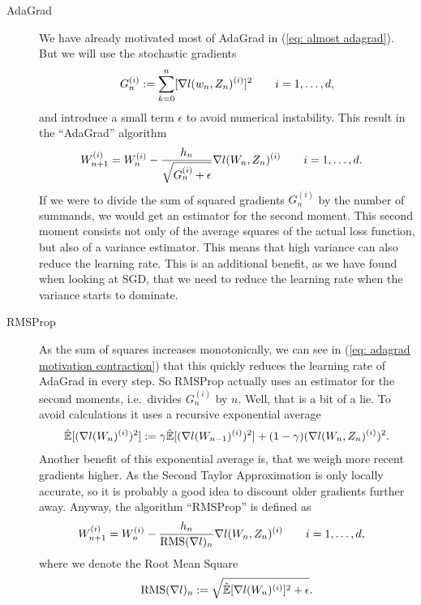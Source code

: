 \begin{description}
	\item[AdaGrad] \parencite{duchiAdaptiveSubgradientMethods2011}
	We have already motivated most of AdaGrad in (\ref{eq: almost adagrad}).
	But we will use the stochastic gradients
	\begin{align*}
		G_n^{(i)} := \sum_{k=0}^n [\nabla l(w_n, Z_n)^{(i)}]^2 \qquad i=1,\dots,d,
	\end{align*}
	and introduce a small term \(\epsilon\) \parencite[\(\approx 10^{-8}\)][]{ruderOverviewGradientDescent2017}
	to avoid numerical instability. This result in the ``AdaGrad'' algorithm
	\begin{align*}
		W_{n+1}^{(i)}
		&= W_n^{(i)}
		- \frac{h_n}{\sqrt{G_n^{(i)}+\epsilon}}\nabla l(W_n, Z_n)^{(i)}
		\qquad i=1,\dots,d.
	\end{align*}
	If we were to divide the sum of squared gradients \(G_n^{(i)}\) by the number
	of summands, we would get an estimator for the second moment. This second
	moment consists not only of the average squares of the actual loss function,
	but also of a variance estimator. This means that high variance can also
	reduce the learning rate. This is an additional benefit, as we have found
	when looking at SGD, that we need to reduce the learning rate when the
	variance starts to dominate.

	\item[RMSProp]\parencite[lecture 6e]{hintonNeuralNetworksMachine2012} As the sum of squares increases monotonically, we can see 
	in (\ref{eq: adagrad motivation contraction}) that this quickly reduces
	the learning rate of AdaGrad in every step. So RMSProp actually uses an
	estimator for the second moments, i.e.\ divides \(G_n^{(i)}\) by \(n\). Well,
	that is a bit of a lie. To avoid calculations it uses a recursive exponential
	average
	\begin{align*}
		\hat{\mathbb{E}}[(\nabla l(W_n)^{(i)})^2]
		:= \gamma \hat{\mathbb{E}}[(\nabla l(W_{n-1})^{(i)})^2]
		+ (1-\gamma)(\nabla l(W_n, Z_n)^{(i)})^2.
	\end{align*}
	Another benefit of this exponential average is, that we weigh more recent
	gradients higher. As the Second Taylor Approximation is only locally
	accurate, so it is probably a good idea to discount older gradients further
	away. Anyway, the algorithm ``RMSProp'' is defined as
	\begin{align*}
		W_{n+1}^{(i)}
		&= W_n^{(i)}
		- \frac{h_n}{\text{RMS}(\nabla l)_n}\nabla l(W_n, Z_n)^{(i)}
		\qquad i=1,\dots,d,
	\end{align*}
	where we denote the Root Mean Square
	\begin{align*}
		\text{RMS}(\nabla l)_n := \sqrt{\hat{\mathbb{E}}[\nabla l(W_n)^{(i)}]^2+\epsilon}.
	\end{align*}


\end{description}
